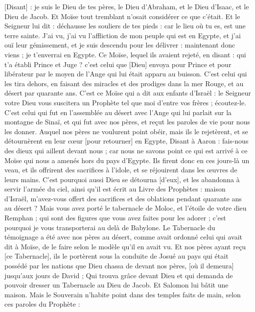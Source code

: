 \begin{multicols}{2}
[Disant] : je suis le Dieu de tes pères, le Dieu d'Abraham, et le Dieu d'Isaac, et le Dieu de Jacob. Et Moïse tout tremblant n'osait considérer ce que c'était.
Et le Seigneur lui dit : déchausse les souliers de tes pieds : car le lieu où tu es, est une terre sainte.
J'ai vu, j'ai vu l'affliction de mon peuple qui est en Egypte, et j'ai ouï leur gémissement, et je suis descendu pour les délivrer : maintenant donc viens ; je t'enverrai en Egypte.
Ce Moïse, lequel ils avaient rejeté, en disant : qui t'a établi Prince et Juge ? c'est celui que [Dieu] envoya pour Prince et pour libérateur par le moyen de l'Ange qui lui était apparu au buisson.
C'est celui qui les tira dehors, en faisant des miracles et des prodiges dans la mer Rouge, et au désert par quarante ans.
C'est ce Moïse qui a dit aux enfants d'Israël : le Seigneur votre Dieu vous suscitera un Prophète tel que moi d'entre vos frères ; écoutez-le.
C'est celui qui fut en l'assemblée au désert avec l'Ange qui lui parlait sur la montagne de Sinaï, et qui fut avec nos pères, et reçut les paroles de vie pour nous les donner.
Auquel nos pères ne voulurent point obéir, mais ils le rejetèrent, et se détournèrent en leur cœur [pour retourner] en Egypte,
Disant à Aaron : fais-nous des dieux qui aillent devant nous ; car nous ne savons point ce qui est arrivé à ce Moïse qui nous a amenés hors du pays d'Egypte.
Ils firent donc en ces jours-là un veau, et ils offrirent des sacrifices à l'idole, et se réjouirent dans les œuvres de leurs mains.
C'est pourquoi aussi Dieu se détourna [d'eux], et les abandonna à servir l'armée du ciel, ainsi qu'il est écrit au Livre des Prophètes : maison d'Israël, m'avez-vous offert des sacrifices et des oblations pendant quarante ans au désert ?
Mais vous avez porté le tabernacle de Moloc, et l'étoile de votre dieu Remphan ; qui sont des figures que vous avez faites pour les adorer ; c'est pourquoi je vous transporterai au delà de Babylone.
Le Tabernacle du témoignage a été avec nos pères au désert, comme avait ordonné celui qui avait dit à Moïse, de le faire selon le modèle qu'il en avait vu.
Et nos pères ayant reçu [ce Tabernacle], ils le portèrent sous la conduite de Josué au pays qui était possédé par les nations que Dieu chassa de devant nos pères, [où il demeura] jusqu'aux jours de David ;
Qui trouva grâce devant Dieu et qui demanda de pouvoir dresser un Tabernacle au Dieu de Jacob.
Et Salomon lui bâtit une maison.
Mais le Souverain n'habite point dans des temples faits de main, selon ces paroles du Prophète :

\end{multicols}

